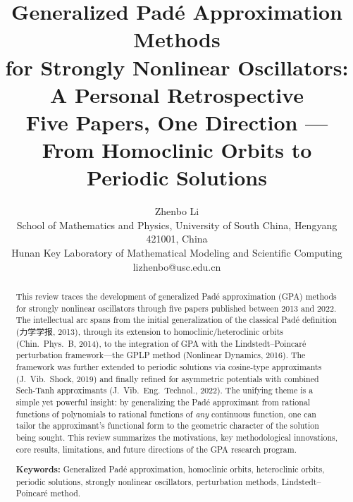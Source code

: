 \documentclass[11pt,a4paper]{article}
\begin{document}
\raggedbottom

\title{\LARGE\bfseries\color{primary} Generalized Pad\'e Approximation Methods\\for Strongly Nonlinear Oscillators: A Personal Retrospective\\[6pt]
\large Five Papers, One Direction --- From Homoclinic Orbits to Periodic Solutions}
\author{Zhenbo Li\\[4pt]
\small School of Mathematics and Physics, University of South China, Hengyang 421001, China\\
\small Hunan Key Laboratory of Mathematical Modeling and Scientific Computing\\
\small lizhenbo@usc.edu.cn}
\date{}
\maketitle

\begin{abstract}
\noindent This review traces the development of generalized Pad\'e approximation (GPA) methods for strongly nonlinear oscillators through five papers published between 2013 and 2022. The intellectual arc spans from the initial generalization of the classical Pad\'e definition (力学学报, 2013), through its extension to homoclinic/heteroclinic orbits (Chin.\ Phys.\ B, 2014), to the integration of GPA with the Lindstedt--Poincar\'e perturbation framework---the GPLP method (Nonlinear Dynamics, 2016). The framework was further extended to periodic solutions via cosine-type approximants (J.\ Vib.\ Shock, 2019) and finally refined for asymmetric potentials with combined Sech-Tanh approximants (J.\ Vib.\ Eng.\ Technol., 2022). The unifying theme is a simple yet powerful insight: by generalizing the Pad\'e approximant from rational functions of polynomials to rational functions of \emph{any} continuous function, one can tailor the approximant's functional form to the geometric character of the solution being sought. This review summarizes the motivations, key methodological innovations, core results, limitations, and future directions of the GPA research program.

\vspace{4pt}
\noindent\textbf{Keywords:} Generalized Pad\'e approximation, homoclinic orbits, heteroclinic orbits, periodic solutions, strongly nonlinear oscillators, perturbation methods, Lindstedt--Poincar\'e method.
\end{abstract}

\tableofcontents
\newpage
\end{document}
